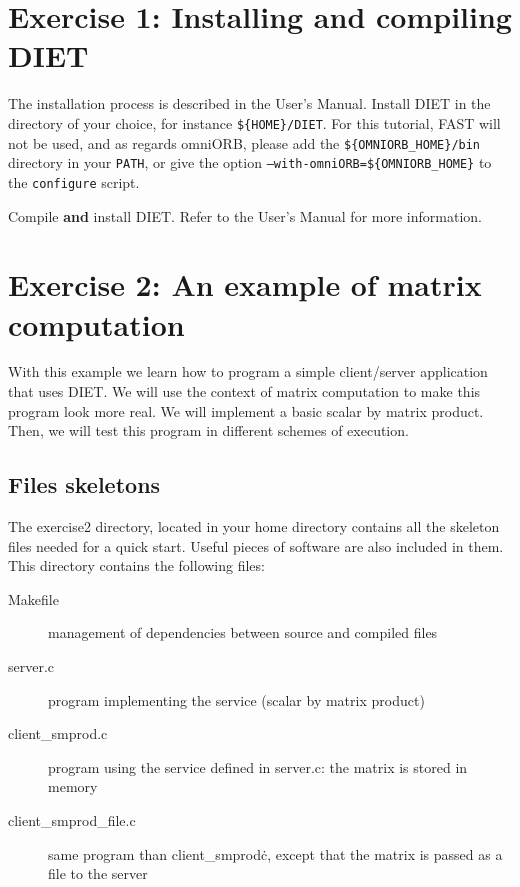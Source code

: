 \documentclass[11pt,a4paper]{article}
\begin{document}
\section{Exercise 1: Installing and compiling DIET}

The installation process is described in the User's Manual. Install DIET in the
directory of your choice, for instance \texttt{\$\{HOME\}/DIET}. For this
tutorial, FAST will not be used, and as regards omniORB, please add the
\texttt{\$\{OMNIORB\_HOME\}/bin} directory in your \texttt{PATH}, or give the
option \texttt{--with-omniORB=\$\{OMNIORB\_HOME\}} to the \texttt{configure}
script.

Compile {\bf and} install DIET. Refer to the User's Manual for more
information.

\section{Exercise 2: An example of matrix computation}

With this example we learn how to program a simple client/server
application that uses DIET. We will use the context of matrix
computation to make this program look more real. We will implement a
basic scalar by matrix product. Then, we will test this program in
different schemes of execution.
\par

\subsection{Files skeletons}

The exercise2 directory, located in your home directory contains all
the skeleton files needed for a quick start. Useful pieces of software
are also included in them. This directory contains the following
files:

\begin{description}
\item[Makefile]{management of dependencies between source and compiled files}
\item[server.c]{program implementing the service (scalar by matrix product)}
\item[client\_smprod.c]{program using the service defined in server.c: the
    matrix is stored in memory}
\item[client\_smprod\_file.c]{same program than client\_smprod\.c, except that
    the matrix is passed as a file to the server}
\end{description}
\end{document}
